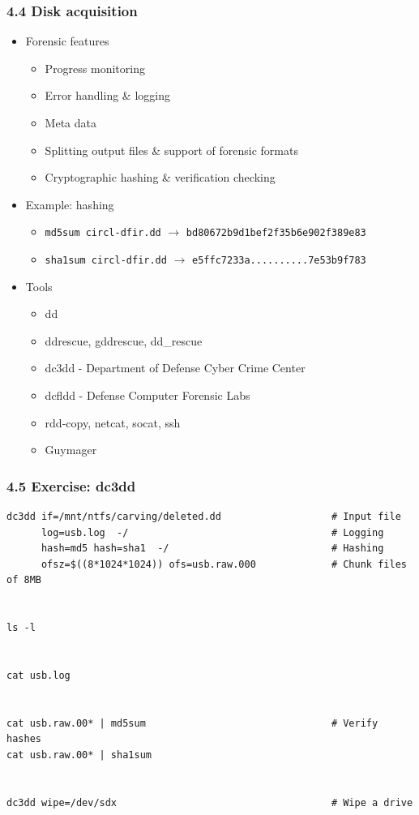 \begin{frame}[fragile]
  \frametitle{4.4 Disk acquisition}
    \begin{itemize}
        \item Forensic features
        \begin{itemize}
            \item Progress monitoring
            \item Error handling \& logging
            \item Meta data
            \item Splitting output files \& support of forensic formats
            \item Cryptographic hashing \& verification checking
        \end{itemize}
        \item Example: hashing
        \begin{itemize}
            \item[] \texttt{md5sum circl-dfir.dd} $\to$ \texttt{bd80672b9d1bef2f35b6e902f389e83}
            \item[] \texttt{sha1sum circl-dfir.dd} $\to$ \texttt{e5ffc7233a..........7e53b9f783}
        \end{itemize}
        \item Tools
        \begin{itemize}
            \item dd
            \item ddrescue, gddrescue, dd\_rescue
            \item dc3dd - Department of Defense Cyber Crime Center
            \item dcfldd - Defense Computer Forensic Labs
	    \item rdd-copy, netcat, socat, ssh
            \item Guymager
        \end{itemize}
    \end{itemize}
\end{frame}


\begin{frame}[fragile]
  \frametitle{4.5 Exercise: dc3dd}
  \begin{lstlisting}[basicstyle=\tiny]
dc3dd if=/mnt/ntfs/carving/deleted.dd                   # Input file
      log=usb.log  -/                                   # Logging
      hash=md5 hash=sha1  -/                            # Hashing
      ofsz=$((8*1024*1024)) ofs=usb.raw.000             # Chunk files of 8MB


ls -l


cat usb.log


cat usb.raw.00* | md5sum                                # Verify hashes
cat usb.raw.00* | sha1sum


dc3dd wipe=/dev/sdx                                     # Wipe a drive
  \end{lstlisting}
\end{frame}


